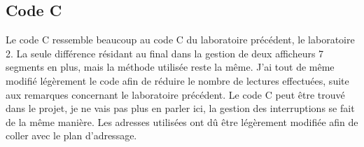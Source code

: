 \subsection{Code C}
Le code C ressemble beaucoup au code C du laboratoire précédent, le laboratoire 2. La seule différence résidant au final dans la gestion de deux afficheurs 7 segments en plus, mais la méthode utilisée reste la même. J'ai tout de même modifié légèrement le code afin de réduire le nombre de lectures effectuées, suite aux remarques concernant le laboratoire précédent. Le code C peut être trouvé dans le projet, je ne vais pas plus en parler ici, la gestion des interruptions se fait de la même manière. Les adresses utilisées ont dû être légèrement modifiée afin de coller avec le plan d'adressage.
